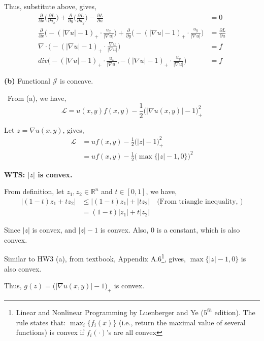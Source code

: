 \documentclass[12pt]{article}
\begin{document}
Thus, substitute above, gives, 
\begin{align*}
	\frac{\partial}{\partial x}\Big(\frac{\partial L}{\partial u_x}\Big) + \frac{\partial}{\partial y}\Big(\frac{\partial L}{\partial u_y}\Big) - \frac{\partial L}{\partial u} &= 0 \\
	\frac{\partial}{\partial x}\Big( -(| \nabla u | - 1)_+ \cdot \frac{u_x}{| \nabla u |} \Big)  + \frac{\partial}{\partial y}\Big( -(| \nabla u | - 1)_+ \cdot \frac{u_y}{| \nabla u |} \Big) &= \frac{\partial L}{\partial u} \\
	\nabla \cdot \Big( -(| \nabla u | - 1)_+ \cdot \frac{\nabla u}{| \nabla u |} \Big) &= f \\
	div \Big( -(| \nabla u | - 1)_+ \cdot \frac{u_x}{| \nabla u |}, -(| \nabla u | - 1)_+ \cdot \frac{u_y}{| \nabla u |} \Big) &= f
\end{align*}

\vspace{10pt}
\noindent
\textbf{(b)}
Functional $\mathcal J$ is concave.

\ From (a), we have, 
$$
\mathcal L = u(x,y)f(x,y) - \frac{1}{2}\big(|\nabla u(x,y)|-1\big)_+^2
$$

Let $z = \nabla u(x,y)$, gives, 
\begin{align*}
	\mathcal L &= uf(x,y) - \frac{1}{2}\big(|z|-1\big)_+^2 \\
	&= uf(x,y) - \frac{1}{2}\Big(\max\{|z| - 1, 0\}\Big)^2
\end{align*}

\quad \textbf{WTS: $|z|$ is convex.}

\quad From definition, let $z_1,z_2\in\mathbb{R}^n$ and $t\in[0,1]$, we have, 
\begin{align*}
	| (1-t)z_1 + t z_2 |
	&\le |(1-t)z_1| + |t z_2| \quad \text{(From triangle inequality, )} \\
	&= (1-t)|z_1| + t|z_2| 
\end{align*}


Since $|z|$ is convex, and $|z| - 1$ is convex. Also,  0 is a constant, which is also convex. 

Similar to HW3 (a), from textbook, Appendix A.6\footnote{Linear and Nonlinear Programming by Luenberger and Ye ($5^{th}$ edition). The rule states that: $\max_i \{ f_i(x) \}$ (i.e., return the maximal value of several functions) is convex if $f_i(\cdot)$'s are all convex}, gives, $\max\{|z| - 1, 0\}$ is also convex. 

Thus, $g(z) = \big(|\nabla u(x,y)|-1\big)_+$ is convex.
\end{document}
